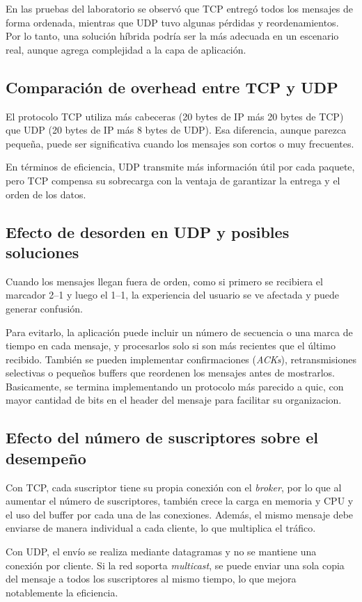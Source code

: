 \documentclass[10pt]{article}
\begin{document}
En las pruebas del laboratorio se observó que TCP entregó todos los mensajes de forma ordenada, mientras que UDP tuvo algunas pérdidas y reordenamientos. Por lo tanto, una solución híbrida podría ser la más adecuada en un escenario real, aunque agrega complejidad a la capa de aplicación.

\subsection{Comparación de overhead entre TCP y UDP}
El protocolo TCP utiliza más cabeceras (20 bytes de IP más 20 bytes de TCP) que UDP (20 bytes de IP más 8 bytes de UDP). Esa diferencia, aunque parezca pequeña, puede ser significativa cuando los mensajes son cortos o muy frecuentes. 

En términos de eficiencia, UDP transmite más información útil por cada paquete, pero TCP compensa su sobrecarga con la ventaja de garantizar la entrega y el orden de los datos.

\subsection{Efecto de desorden en UDP y posibles soluciones}
Cuando los mensajes llegan fuera de orden, como si primero se recibiera el marcador 2--1 y luego el 1--1, la experiencia del usuario se ve afectada y puede generar confusión. 

Para evitarlo, la aplicación puede incluir un número de secuencia o una marca de tiempo en cada mensaje, y procesarlos solo si son más recientes que el último recibido. También se pueden implementar confirmaciones (\textit{ACKs}), retransmisiones selectivas o pequeños buffers que reordenen los mensajes antes de mostrarlos. Basicamente, se termina implementando un protocolo más parecido a quic, con mayor cantidad de bits en el header del mensaje para facilitar su organizacion.

\subsection{Efecto del número de suscriptores sobre el desempeño}
Con TCP, cada suscriptor tiene su propia conexión con el \textit{broker}, por lo que al aumentar el número de suscriptores, también crece la carga en memoria y CPU y el uso del buffer por cada una de las conexiones. Además, el mismo mensaje debe enviarse de manera individual a cada cliente, lo que multiplica el tráfico.

Con UDP, el envío se realiza mediante datagramas y no se mantiene una conexión por cliente. Si la red soporta \textit{multicast}, se puede enviar una sola copia del mensaje a todos los suscriptores al mismo tiempo, lo que mejora notablemente la eficiencia. 
\end{document}
